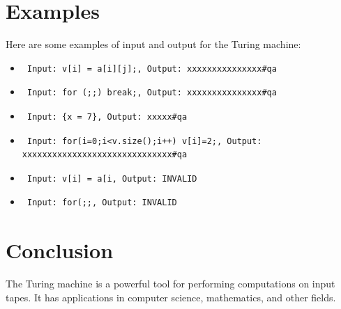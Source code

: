 \documentclass{article}
\begin{document}
\section{Examples}
Here are some examples of input and output for the Turing machine:
\begin{itemize}
    \item \begin{verbatim} Input: v[i] = a[i][j];, Output: xxxxxxxxxxxxxxx#qa \end{verbatim}
    \item \begin{verbatim} Input: for (;;) break;, Output: xxxxxxxxxxxxxxx#qa \end{verbatim}
    \item \begin{verbatim} Input: {x = 7}, Output: xxxxx#qa \end{verbatim}
    \item \begin{verbatim} Input: for(i=0;i<v.size();i++) v[i]=2;, Output: xxxxxxxxxxxxxxxxxxxxxxxxxxxxxx#qa \end{verbatim}
    \item \begin{verbatim} Input: v[i] = a[i, Output: INVALID \end{verbatim}
    \item \begin{verbatim} Input: for(;;, Output: INVALID \end{verbatim}
\end{itemize}

\section{Conclusion}
The Turing machine is a powerful tool for performing computations on input tapes. It has applications in computer science, mathematics, and other fields.
\end{document}
